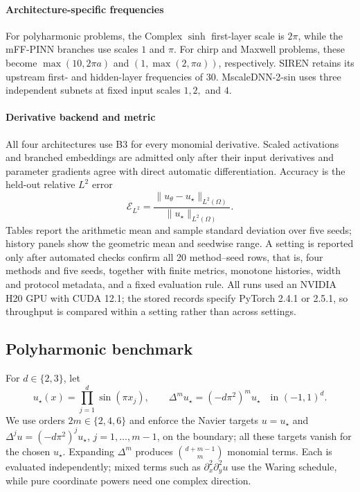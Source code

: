 \paragraph{Architecture-specific frequencies}
For polyharmonic problems, the Complex \(\sinh\) first-layer scale is
\(2\pi\), while the mFF-PINN branches use scales \(1\) and \(\pi\). For chirp
and Maxwell problems, these become
\(\max(10,2\pi a)\) and \((1,\max(2,\pi a))\), respectively. SIREN retains
its upstream first- and hidden-layer frequencies of 30. MscaleDNN-2-sin uses
three independent subnets at fixed input scales \(1,2,\) and \(4\).

\paragraph{Derivative backend and metric}
All four architectures use B3 for every monomial derivative. Scaled
activations and branched embeddings are admitted only after their input
derivatives and parameter gradients agree with direct automatic
differentiation. Accuracy is the held-out relative \(L^2\) error
\begin{equation}
  \mathcal{E}_{L^2}
  =
  \frac{\lVert u_\theta-u_\star\rVert_{L^2(\Omega)}}
       {\lVert u_\star\rVert_{L^2(\Omega)}}.
\label{eq:benchmark-l2}
\end{equation}
Tables report the arithmetic mean and sample standard deviation over five
seeds; history panels show the geometric mean and seedwise range. A
setting is reported only after automated checks confirm all 20
method--seed rows, that is, four methods and five seeds, together with finite
metrics, monotone
histories, width and protocol metadata, and a fixed evaluation rule. All runs
used an NVIDIA H20 GPU with CUDA 12.1; the stored records specify PyTorch
2.4.1 or 2.5.1, so throughput is compared within a setting rather than
across settings.

\subsection{Polyharmonic benchmark}
\label{sec:bm:poly}

For \(d\in\{2,3\}\), let
\begin{equation}
  u_\star(x)=\prod_{j=1}^{d}\sin(\pi x_j),
  \qquad
  \Delta^m u_\star=(-d\pi^2)^m u_\star
  \quad\text{in }(-1,1)^d.
\end{equation}
We use orders \(2m\in\{2,4,6\}\) and enforce the Navier targets
\(u=u_\star\) and
\(\Delta^j u=(-d\pi^2)^j u_\star\), \(j=1,\ldots,m-1\), on the boundary;
all these targets vanish for the chosen \(u_\star\). Expanding
\(\Delta^m\) produces
\(\binom{d+m-1}{m}\) monomial terms. Each is evaluated independently; mixed
terms such as \(\partial_x^2\partial_y^2 u\) use the Waring schedule, while
pure coordinate powers need one complex direction.

